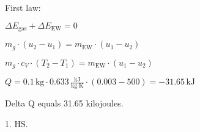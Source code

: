 First law:  

\( \Delta E_{\text{gas}} + \Delta E_{\text{EW}} = 0 \)  

\( m_g \cdot (u_2 - u_1) = m_{\text{EW}} \cdot (u_1 - u_2) \)  

\( m_g \cdot c_V \cdot (T_2 - T_1) = m_{\text{EW}} \cdot (u_1 - u_2) \)  

\( Q = 0.1 \, \text{kg} \cdot 0.633 \, \frac{\text{kJ}}{\text{kg·K}} \cdot (0.003 - 500) = -31.65 \, \text{kJ} \)

Delta Q equals 31.65 kilojoules.  

1. HS.